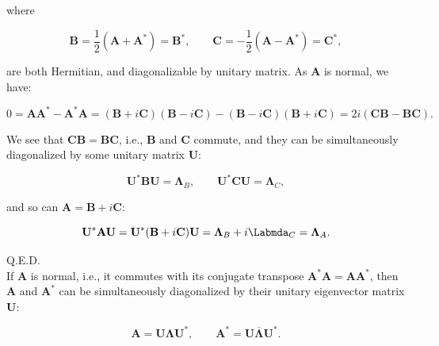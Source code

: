 \documentclass[10pt,b5paper,titlepage]{book}
\begin{document}
\begin{itemize}
        where

        \begin{equation}
            \mathbf{B} = \frac{1}{2}(\mathbf{A} + \mathbf{A}^{*}) = \mathbf{B}^{*}
            , \qquad
            \mathbf{C} = -\frac{1}{2}(\mathbf{A} - \mathbf{A}^{*}) = \mathbf{C}^{*}
        ,\end{equation}

        are both Hermitian, and diagonalizable by unitary matrix. As $\mathbf{A}$
        is normal, we have:

        \begin{equation}
            0 = \mathbf{A}\mathbf{A}^{*} - \mathbf{A}^{*}\mathbf{A}
            = (\mathbf{B} + i \mathbf{C})(\mathbf{B} - i \mathbf{C})
            - (\mathbf{B} - i \mathbf{C})(\mathbf{B} + i \mathbf{C})
            = 2 i (\mathbf{C}\mathbf{B} - \mathbf{B}\mathbf{C})
        .\end{equation}

        We see that $\mathbf{C}\mathbf{B} = \mathbf{B}\mathbf{C}$, i.e.,
        $\mathbf{B}$ and $\mathbf{C}$ commute, and they can be simultaneously
        diagonalized by some unitary matrix $\mathbf{U}$:

        \begin{equation}
            \mathbf{U}^{*}\mathbf{B}\mathbf{U} = \mathbf{\Lambda}_{B}
            , \qquad
            \mathbf{U}^{*}\mathbf{C}\mathbf{U} = \mathbf{\Lambda}_{C}
        ,\end{equation}

        and so can $\mathbf{A} = \mathbf{B} + i \mathbf{C}$:

        \begin{equation}
            \mathbf{U}^{*}\mathbf{A}\mathbf{U}
            = \mathbf{U}^{*}(\mathbf{B} + i \mathbf{C})\mathbf{U}
            = \mathbf{\Lambda}_{B} + i \mathbf{\Labmda}_{C} = \mathbf{\Lambda}_{A}
        .\end{equation}
\end{itemize}

Q.E.D.\\

If $\mathbf{A}$ is normal, i.e., it commutes with its conjugate transpose
$\mathbf{A}^{*}\mathbf{A} = \mathbf{A}\mathbf{A}^{*}$, then $\mathbf{A}$
and $\mathbf{A}^{*}$ can be simultaneously diagonalized by their unitary eigenvector
matrix $\mathbf{U}$:

\begin{equation}
    \mathbf{A} = \mathbf{U}\mathbf{\Lambda}\mathbf{U}^{*}
    , \qquad
    \mathbf{A}^{*} = \mathbf{U}\overline{\mathbf{\Lambda}}\mathbf{U}^{*}
.\end{equation}
\end{document}
